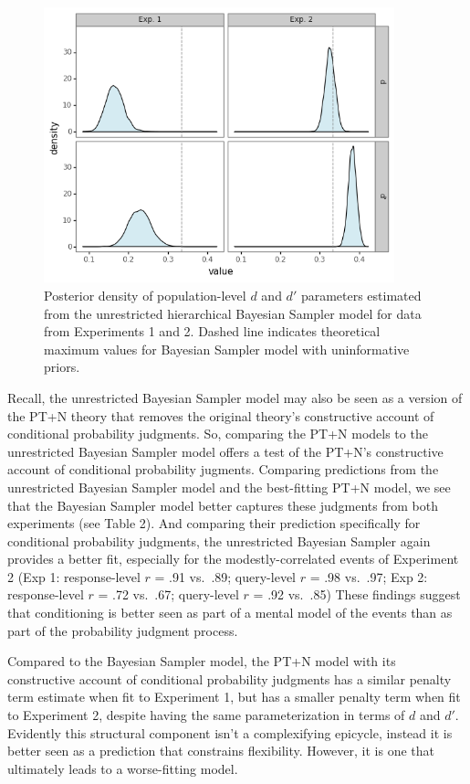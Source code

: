 \documentclass[
  english,
  man,floatsintext]{apa6}
\begin{document}
\begin{figure}[ht]
\centering
\includegraphics[width=4in]{plot_params.png}
\caption{Posterior density of population-level $d$  and $d'$ parameters estimated from the unrestricted hierarchical Bayesian Sampler model for data from Experiments 1 and 2. Dashed line indicates theoretical maximum values for Bayesian Sampler model with uninformative priors.}
\end{figure}

Recall, the unrestricted Bayesian Sampler model may also be seen as a version of the PT+N theory that removes the original theory's constructive account of conditional probability judgments. So, comparing the PT+N models to the unrestricted Bayesian Sampler model offers a test of the PT+N's constructive account of conditional probability jugments. Comparing predictions from the unrestricted Bayesian Sampler model and the best-fitting PT+N model, we see that the Bayesian Sampler model better captures these judgments from both experiments (see Table 2). And comparing their prediction specifically for conditional probability judgments, the unrestricted Bayesian Sampler again provides a better fit, especially for the modestly-correlated events of Experiment 2 (Exp 1: response-level \(r\) = .91 vs.~.89; query-level \(r\) = .98 vs.~.97; Exp 2: response-level \(r\) = .72 vs.~.67; query-level \(r\) = .92 vs.~.85) These findings suggest that conditioning is better seen as part of a mental model of the events than as part of the probability judgment process.

Compared to the Bayesian Sampler model, the PT+N model with its constructive account of conditional probability judgments has a similar penalty term estimate when fit to Experiment 1, but has a smaller penalty term when fit to Experiment 2, despite having the same parameterization in terms of \(d\) and \(d'\). Evidently this structural component isn't a complexifying epicycle, instead it is better seen as a prediction that constrains flexibility. However, it is one that ultimately leads to a worse-fitting model.
\end{document}
